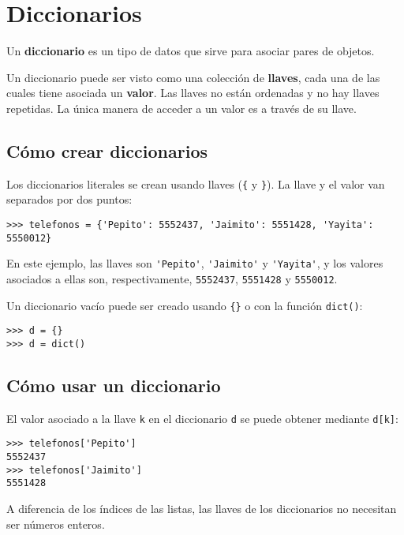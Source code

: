 \chapter{Diccionarios}

Un \textbf{diccionario} es un tipo de datos que sirve para asociar pares
de objetos.

Un diccionario puede ser visto como una colección de \textbf{llaves},
cada una de las cuales tiene asociada un \textbf{valor}. Las llaves no
están ordenadas y no hay llaves repetidas. La única manera de acceder a
un valor es a través de su llave.

\section{Cómo crear diccionarios}

Los diccionarios literales se crean usando llaves (\lstinline!{! y
\lstinline!}!). La llave y el valor van separados por dos puntos:

\begin{lstlisting}
>>> telefonos = {'Pepito': 5552437, 'Jaimito': 5551428, 'Yayita': 5550012}
\end{lstlisting}

En este ejemplo, las llaves son \lstinline!'Pepito'!,
\lstinline!'Jaimito'! y \lstinline!'Yayita'!, y los valores asociados a
ellas son, respectivamente, \lstinline!5552437!, \lstinline!5551428! y
\lstinline!5550012!.

Un diccionario vacío puede ser creado usando \lstinline!{}! o con la
función \lstinline!dict()!:

\begin{lstlisting}
>>> d = {}
>>> d = dict()
\end{lstlisting}

\section{Cómo usar un diccionario}

El valor asociado a la llave \lstinline!k! en el diccionario
\lstinline!d! se puede obtener mediante \lstinline!d[k]!:

\begin{lstlisting}
>>> telefonos['Pepito']
5552437
>>> telefonos['Jaimito']
5551428
\end{lstlisting}

A diferencia de los índices de las listas, las llaves de los
diccionarios no necesitan ser números enteros.

